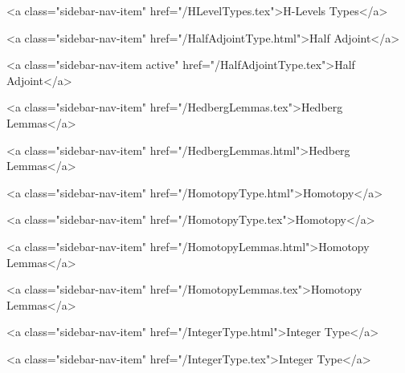       
        
          <a class="sidebar-nav-item" href="/HLevelTypes.tex">H-Levels Types</a>
        
      
    
      
        
          <a class="sidebar-nav-item" href="/HalfAdjointType.html">Half Adjoint</a>
        
      
    
      
        
          <a class="sidebar-nav-item active" href="/HalfAdjointType.tex">Half Adjoint</a>
        
      
    
      
        
          <a class="sidebar-nav-item" href="/HedbergLemmas.tex">Hedberg Lemmas</a>
        
      
    
      
        
          <a class="sidebar-nav-item" href="/HedbergLemmas.html">Hedberg Lemmas</a>
        
      
    
      
        
          <a class="sidebar-nav-item" href="/HomotopyType.html">Homotopy</a>
        
      
    
      
        
          <a class="sidebar-nav-item" href="/HomotopyType.tex">Homotopy</a>
        
      
    
      
        
          <a class="sidebar-nav-item" href="/HomotopyLemmas.html">Homotopy Lemmas</a>
        
      
    
      
        
          <a class="sidebar-nav-item" href="/HomotopyLemmas.tex">Homotopy Lemmas</a>
        
      
    
      
        
          <a class="sidebar-nav-item" href="/IntegerType.html">Integer Type</a>
        
      
    
      
        
          <a class="sidebar-nav-item" href="/IntegerType.tex">Integer Type</a>
        
      
    
